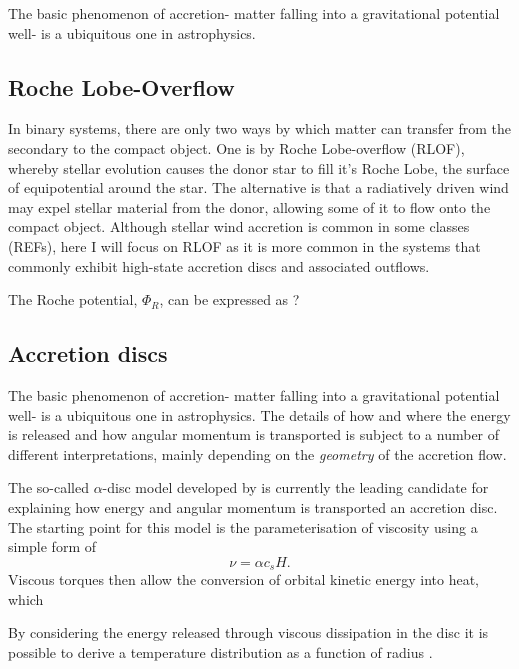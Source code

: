 The basic phenomenon of accretion- matter falling into a gravitational potential well- 
is a ubiquitous one in astrophysics. 


\subsection{Roche Lobe-Overflow}

In binary systems, there are only two ways by which matter can transfer 
from the secondary to the compact object. One is by Roche Lobe-overflow (RLOF),
whereby stellar evolution causes the donor star to fill it's Roche Lobe, the surface
of equipotential around the star. The alternative is that a radiatively driven wind
may expel stellar material from the donor, allowing some of it to flow onto the compact object.
Although stellar wind accretion is common in some classes (REFs), here I will focus on 
RLOF as it is more common in the systems that commonly exhibit high-state accretion discs
and associated outflows.

The Roche potential, $\Phi_R$, can be expressed as ?



\subsection{Accretion discs}

The basic phenomenon of accretion- matter falling into a gravitational potential well- 
is a ubiquitous one in astrophysics. The details of how and where the energy is released
and how angular momentum is transported is subject to a number of different 
interpretations, mainly depending on the {\em geometry} of the accretion flow.




The so-called $\alpha$-disc model developed by \cite[][hereafter SS73]{shakurasunyaev1973} is
currently the leading candidate for explaining how energy and angular momentum
is transported an accretion disc. The starting point for this model is the parameterisation
of viscosity using a simple form of
\begin{equation}
\nu = \alpha c_s H.
\end{equation}
Viscous torques then allow the conversion of orbital kinetic energy into heat, which 


By considering the energy released through viscous dissipation 
in the disc it is possible to derive a temperature distribution as a function of 
radius \citep{shakurasunyaev1973, fkrbook}. 

